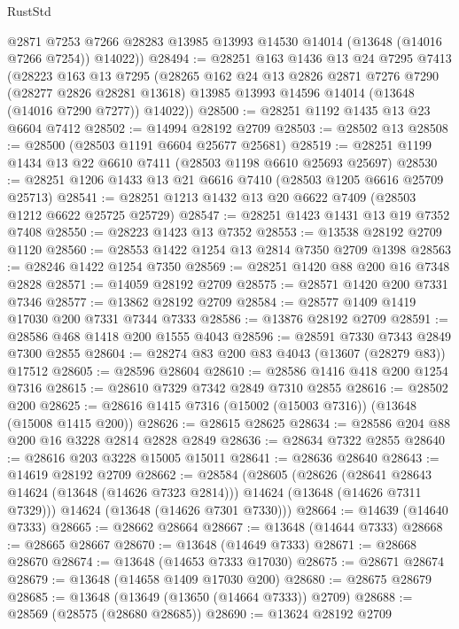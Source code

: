\begin{lexlean}{RustStd}
\begin{coremodule}
        @2871
        @7253
        @7266
        @28283
        @13985
        @13993
        @14530
        @14014
        (@13648 (@14016 @7266 @7254))
        @14022))
@28494 := @28251
    @163
    @1436
    @13
    @24
    @7295
    @7413
    (@28223
      @163
      @13
      @7295
      (@28265
        @162
        @24
        @13
        @2826
        @2871
        @7276
        @7290
        (@28277 @2826 @28281 @13618)
        @13985
        @13993
        @14596
        @14014
        (@13648 (@14016 @7290 @7277))
        @14022))
@28500 := @28251 @1192 @1435 @13 @23 @6604 @7412
@28502 := @14994 @28192 @2709
@28503 := @28502 @13
@28508 := @28500 (@28503 @1191 @6604 @25677 @25681)
@28519 := @28251 @1199 @1434 @13 @22 @6610 @7411 (@28503 @1198 @6610 @25693 @25697)
@28530 := @28251 @1206 @1433 @13 @21 @6616 @7410 (@28503 @1205 @6616 @25709 @25713)
@28541 := @28251 @1213 @1432 @13 @20 @6622 @7409 (@28503 @1212 @6622 @25725 @25729)
@28547 := @28251 @1423 @1431 @13 @19 @7352 @7408
@28550 := @28223 @1423 @13 @7352
@28553 := @13538 @28192 @2709 @1120
@28560 := @28553 @1422 @1254 @13 @2814 @7350 @2709 @1398
@28563 := @28246 @1422 @1254 @7350
@28569 := @28251 @1420 @88 @200 @16 @7348 @2828
@28571 := @14059 @28192 @2709
@28575 := @28571 @1420 @200 @7331 @7346
@28577 := @13862 @28192 @2709
@28584 := @28577 @1409 @1419 @17030 @200 @7331 @7344 @7333
@28586 := @13876 @28192 @2709
@28591 := @28586 @468 @1418 @200 @1555 @4043
@28596 := @28591 @7330 @7343 @2849 @7300 @2855
@28604 := @28274 @83 @200 @83 @4043 (@13607 (@28279 @83)) @17512
@28605 := @28596 @28604
@28610 := @28586 @1416 @418 @200 @1254 @7316
@28615 := @28610 @7329 @7342 @2849 @7310 @2855
@28616 := @28502 @200
@28625 := @28616 @1415 @7316 (@15002 (@15003 @7316)) (@13648 (@15008 @1415 @200))
@28626 := @28615 @28625
@28634 := @28586 @204 @88 @200 @16 @3228 @2814 @2828 @2849
@28636 := @28634 @7322 @2855
@28640 := @28616 @203 @3228 @15005 @15011
@28641 := @28636 @28640
@28643 := @14619 @28192 @2709
@28662 := @28584
    (@28605
      (@28626
        (@28641 @28643 @14624 (@13648 (@14626 @7323 @2814)))
        @14624
        (@13648 (@14626 @7311 @7329)))
      @14624
      (@13648 (@14626 @7301 @7330)))
@28664 := @14639 (@14640 @7333)
@28665 := @28662 @28664
@28667 := @13648 (@14644 @7333)
@28668 := @28665 @28667
@28670 := @13648 (@14649 @7333)
@28671 := @28668 @28670
@28674 := @13648 (@14653 @7333 @17030)
@28675 := @28671 @28674
@28679 := @13648 (@14658 @1409 @17030 @200)
@28680 := @28675 @28679
@28685 := @13648 (@13649 (@13650 (@14664 @7333)) @2709)
@28688 := @28569 (@28575 (@28680 @28685))
@28690 := @13624 @28192 @2709

\end{coremodule}
\end{lexlean}
